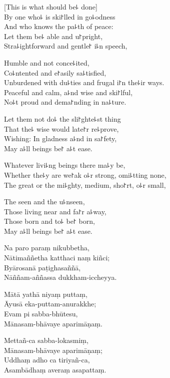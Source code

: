 
\begin{leader}
\end{leader}

[This is what should be꜕ done]\\
By one who꜕ is ski꜓lled in go꜕odness\\
And who knows the pa꜕th of peace:\\
Let them be꜕ able and u꜓pright,\\
Stra꜕ightforward and gentle꜓ i꜕n speech,

Humble and not conce꜕ited,\\
Co꜕ntented and e꜓asily sa꜕tisfied,\\
Unburdened with du꜕ties and frugal i꜓n the꜕ir ways.\\
Peaceful and calm, a꜕nd wise and ski꜓lful,\\
No꜕t proud and dema꜓nding in na꜕ture.

Let them not do꜕ the sli꜓ghte꜕st thing\\
That the꜕ wise would late꜓r re꜕prove,\\
Wishing: In gladness a꜕nd in sa꜓fety,\\
May a꜕ll beings be꜓ a꜕t ease.

Whatever livi꜕ng beings there ma꜕y be,\\
Whether the꜕y are we꜓ak o꜕r strong, omi꜕tting none,\\
The great or the mi꜕ghty, medium, sho꜓rt, o꜕r small,

The seen and the u꜕nseen,\\
Those living near and fa꜓r a꜕way,\\
Those born and to꜕ be꜓ born,\\
May a꜕ll beings be꜓ a꜕t ease.

\clearpage

Na paro paraṃ nikubbetha,\\%
Nātimaññetha katthaci naṃ kiñci;\\
Byārosanā paṭighasaññā,\\
Nāññam-aññassa dukkham-iccheyya.

Mātā yathā niyaṃ puttaṃ,\\
Āyusā eka-puttam-anurakkhe;\\
Evam pi sabba-bhūtesu,\\
Mānasam-bhāvaye aparimāṇaṃ.

Mettañ-ca sabba-lokasmiṃ,\\
Mānasam-bhāvaye aparimāṇaṃ;\\
Uddhaṃ adho ca tiriyañ-ca,\\
Asambādhaṃ averaṃ asapattaṃ.


